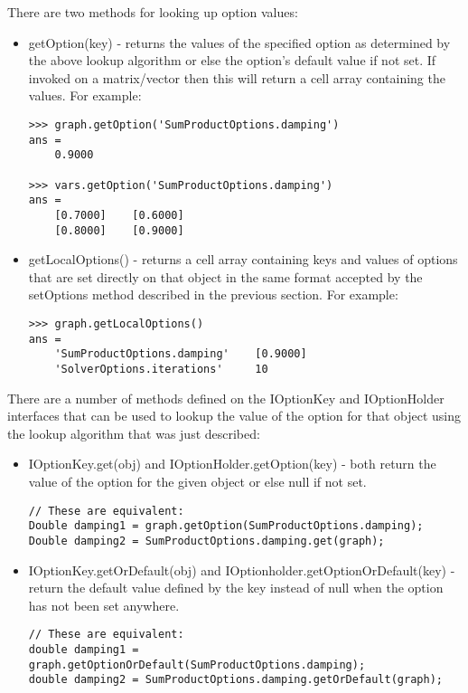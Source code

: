 \ifmatlab
There are two methods for looking up option values:

\begin{itemize}
\item getOption(key) - returns the values of the specified option as determined by the above lookup algorithm or else the option's default value if not set. If invoked on a matrix/vector then this will return a cell array containing the values. For example:
\begin{lstlisting}
>>> graph.getOption('SumProductOptions.damping')
ans =
    0.9000
    
>>> vars.getOption('SumProductOptions.damping')
ans =
    [0.7000]    [0.6000]
    [0.8000]    [0.9000]
\end{lstlisting}

\item getLocalOptions() - returns a cell array containing keys and values of options that are set directly on that object in the same format accepted by the setOptions method described in the previous section. For example:
\begin{lstlisting}
>>> graph.getLocalOptions()
ans =
    'SumProductOptions.damping'    [0.9000]
    'SolverOptions.iterations'     10
\end{lstlisting}
\end{itemize}
\fi %

\ifjava
There are a number of methods defined on the IOptionKey and IOptionHolder interfaces that can be used to lookup the value of the option for that object using the lookup algorithm that was just described:

\begin{itemize}
\item IOptionKey.get(obj) and IOptionHolder.getOption(key) - both return the value of the option for the given object or else null if not set.
\begin{lstlisting}
// These are equivalent:
Double damping1 = graph.getOption(SumProductOptions.damping);
Double damping2 = SumProductOptions.damping.get(graph);
\end{lstlisting}
\item IOptionKey.getOrDefault(obj) and IOptionholder.getOptionOrDefault(key) - return the default value defined by the key instead of null when the option has not been set anywhere.
\begin{lstlisting}
// These are equivalent:
double damping1 = graph.getOptionOrDefault(SumProductOptions.damping);
double damping2 = SumProductOptions.damping.getOrDefault(graph);
\end{lstlisting}
\end{itemize}

